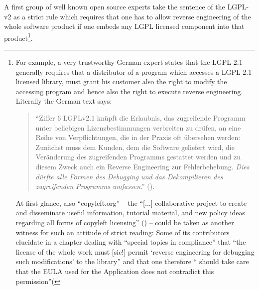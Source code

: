 A first group of well known open source experts take the sentence of the LGPL-v2
as a strict rule which requires that one has to allow reverse engineering of the
whole software product if one embeds any LGPL licensed component into that
product\footnote{For example, a very trustworthy German expert states that the
LGPL-2.1 generally requires that a distributor of a program which accesses a
LGPL-2.1 licensed library, must grant his customer also the right to modify the
accessing program and hence also the right to execute reverse engineering.
Literally the German text says:
\begin{quote}\enquote{Ziffer 6 LGPLv2.1 knüpft die Erlaubnis, das zugreifende
Programm unter beliebigen Lizenzbestimmungen verbreiten zu drüfen, an eine Reihe
von Verpflichtungen, die in der Praxis oft übersehen werden: Zunächst muss dem
Kunden, dem die Software geliefert wird, die Veränderung des zugreifenden
Programms gestattet werden und zu diesem Zweck auch ein Reverse Engineering zur
Fehlerbehebung. \emph{Dies dürfte alle Formen des Debugging und das
Dekompilieren des zugreifenden Programms umfassen}.} (\cite[cf.][81; emphasis
KR]{JaeMet2011a}).\end{quote} At first glance, also \enquote{copyleft.org} --
the \enquote{[...] collaborative project to create and disseminate useful
information, tutorial material, and new policy ideas regarding all forms of
copyleft licensing} (\cite[cf.][\nopage wp.]{CopyLeftOrg2014a}) -- could be
taken as another witness for such an attitude of strict reading: Some of its
contributors elucidate in a chapter dealing with \enquote{special topics in
compliance} that \enquote{the license of the whole work must [sic!] permit
\enquote{reverse engineering for debugging such modifications} to the library}
and that one therefore \enquote{ should take care that the EULA used for the
Application does not contradict this
permission}(\cite[cf.][86]{KuhSebGin2014a}}.

